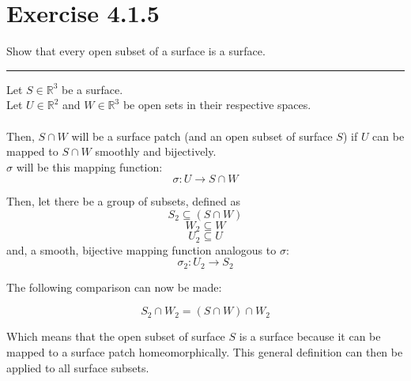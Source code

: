 \documentclass[12pt]{article}
\begin{document}
\maketitle

\section*{Exercise 4.1.5}
Show that every open subset of a surface is a surface.

\vspace{1cm}
\hrule
\vspace{1cm}

Let $S \in \mathbb{R}^3$ be a surface.\\
Let $U \in \mathbb{R}^2$ and $W \in \mathbb{R}^3$ be open sets in their respective spaces.\\
\\
\indent
Then, $S \cap W$ will be a surface patch (and an open subset of surface $S$) if $U$ can be mapped to $S \cap W$ smoothly and bijectively.\\
\indent
$\sigma$ will be this mapping function:
$$
\sigma: U \rightarrow S \cap W
$$

Then, let there be a group of subsets, defined as
$$ S_2 \subseteq \left( S \cap W \right)$$
$$ W_2 \subseteq W$$
$$ U_2 \subseteq U$$
and, a smooth, bijective mapping function analogous to $\sigma$:
$$
\sigma_2: U_2 \rightarrow S_2
$$

The following comparison can now be made:

$$
S_2 \cap W_2 = \left( S \cap W \right) \cap W_2
$$

Which means that the open subset of surface $S$ is a surface because it can be mapped to a surface patch homeomorphically. This general definition can then be applied to all surface subsets.
\end{document}
